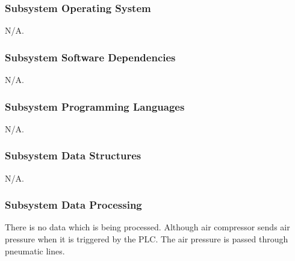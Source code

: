 \subsubsection{Subsystem Operating System}
N/A.

\subsubsection{Subsystem Software Dependencies}
N/A.

\subsubsection{Subsystem Programming Languages}
N/A.

\subsubsection{Subsystem Data Structures}
N/A.

\subsubsection{Subsystem Data Processing}
There is no data which is being processed. Although air compressor sends air pressure when it is triggered by the PLC. The air pressure is passed through pneumatic lines.